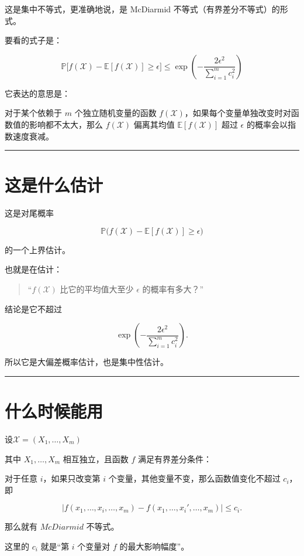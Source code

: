 这是集中不等式，更准确地说，是 McDiarmid 不等式（有界差分不等式）的形式。

要看的式子是：

\[
\mathbb{P}\bigl[f(\mathcal X)-\mathbb{E}[f(\mathcal X)]\ge \epsilon\bigr] \le \exp\!\left( -\frac{2\epsilon^2}{\sum_{i=1}^m c_i^2} \right)
\]

它表达的意思是：

对于某个依赖于 \(m\) 个独立随机变量的函数 \(f(\mathcal X)\)，如果每个变量单独改变时对函数值的影响都不太大，那么 \(f(\mathcal X)\) 偏离其均值 \(\mathbb E[f(\mathcal X)] \) 超过 \(\epsilon\) 的概率会以指数速度衰减。

\hrule

\section{这是什么估计}

这是对尾概率

\[
\mathbb P\bigl(f(\mathcal X)-\mathbb E[f(\mathcal X)]\ge \epsilon\bigr)
\]

的一个上界估计。

也就是在估计：

\begin{quote}
“\(f(\mathcal X)\) 比它的平均值大至少 \(\epsilon\) 的概率有多大？”
\end{quote}

结论是它不超过

\[
\exp\!\left(-\frac{2\epsilon^2}{\sum_{i=1}^m c_i^2}\right).
\]

所以它是大偏差概率估计，也是集中性估计。

\hrule

\section{什么时候能用}

设\(\mathcal X=(X_1,\dots,X_m)\)

其中 \(X_1,\dots,X_m\) 相互独立，且函数 \(f\) 满足有界差分条件：

对于任意 \(i\)，如果只改变第 \(i\) 个变量，其他变量不变，那么函数值变化不超过 \(c_i\)，即

\[
|f(x_1,\dots,x_i,\dots,x_m)-f(x_1,\dots,x_i',\dots,x_m)|\le c_i.
\]

那么就有 \(McDiarmid\) 不等式。

这里的 \(c_i\) 就是“第 \(i\) 个变量对 \(f\) 的最大影响幅度”。

